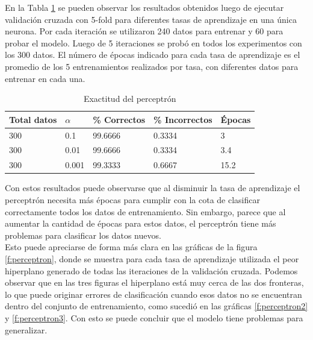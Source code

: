 \documentclass[a4paper]{article}
\begin{document}
		En la Tabla \ref{tabla:accPerceptron} se pueden observar los resultados obtenidos luego de ejecutar validación cruzada con 5-fold para diferentes tasas de aprendizaje en una única neurona. Por cada iteración se utilizaron 240 datos para entrenar y 60 para probar el modelo. Luego de 5 iteraciones se probó en todos los experimentos con los 300 datos. El número de épocas indicado para cada tasa de aprendizaje es el promedio de los 5 entrenamientos realizados por tasa, con diferentes datos para entrenar en cada una.\\
		
		\begin{table}[H]
		\begin{center}
		\begin{tabular}{|l|l|l|l|l|}
		\hline
		Total datos & $\alpha$ & \% Correctos & \% Incorrectos & Épocas\\
		\hline \hline
		300 & 0.1 & 99.6666 & 0.3334 & 3\\ \hline
		300 & 0.01 & 99.6666 & 0.3334 & 3.4\\ \hline
		300 & 0.001 & 99.3333 & 0.6667 & 15.2\\ \hline
		\end{tabular}
		\caption{Exactitud del perceptrón}
		\label{tabla:accPerceptron}
		\end{center}
		\end{table}
		
		Con estos resultados puede observarse que al disminuir la tasa de aprendizaje el perceptrón necesita más épocas para cumplir con la cota de clasificar correctamente todos los datos de entrenamiento. Sin embargo, parece que al aumentar la cantidad de épocas para estos datos, el perceptrón tiene más problemas para clasificar los datos nuevos.\\
					
		Esto puede apreciarse de forma más clara en las gráficas de la figura \ref{f:perceptron}, donde se muestra para cada tasa de aprendizaje utilizada el peor hiperplano generado de todas las iteraciones de la validación cruzada. Podemos observar que en las tres figuras el hiperplano está muy cerca de las dos fronteras, lo que puede originar errores de clasificación cuando esos datos no se encuentran dentro del conjunto de entrenamiento, como sucedió en las gráficas \ref{f:perceptron2} y \ref{f:perceptron3}. Con esto se puede concluir que el modelo tiene problemas para generalizar.			
				
\end{document}
